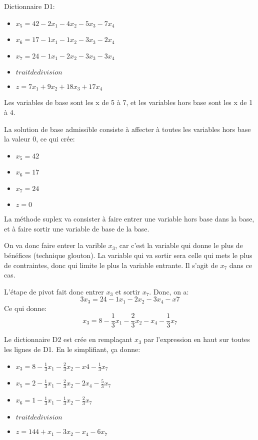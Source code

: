 Dictionnaire D1:
\begin{itemize}
    \item $x_5 = 42 - 2x_1 - 4x_2 - 5x_3 - 7x_4$
    \item $x_6 = 17 - 1x_1 - 1x_2 - 3x_3 - 2x_4$
    \item $x_7 = 24 - 1x_1 - 2x_2 - 3x_3 - 3x_4$
    \item $trait de division$
    \item $z = 7x_1 + 9x_2 + 18x_3 + 17 x_4$
\end{itemize}

Les variables de base sont les x de 5 à 7, et les
variables hors base sont les x de 1 à 4.

La solution de base admissible consiste à affecter à
toutes les variables hors base la valeur 0, ce qui crée:
\begin{itemize}
    \item $x_5 = 42$
    \item $x_6 = 17$
    \item $x_7 = 24$
    \item $z = 0$
\end{itemize}

La méthode suplex va consister à faire entrer une
variable hors base dans la base, et à faire sortir une
variable de base de la base.

On va donc faire entrer la varible $x_3$, car c'est la
variable qui donne le plus de bénéfices
(technique glouton). La variable qui va sortir sera
celle qui mets le plus de contraintes, donc qui limite
le plus la variable entrante. Il s'agit de $x_7$ dans
ce cas.

L'étape de pivot fait donc entrer $x_3$ et sortir $x_7$.
Donc, on a:
$$3x_3 = 24 - 1x_1 - 2x_2 - 3x_4 - x7$$
Ce qui donne:
$$x_3 = 8 - \frac{1}{3}x_1 - \frac{2}{3}x_2 - x_4 - \frac{1}{3}x_7$$

Le dictionnaire D2 est crée en remplaçant $x_3$ par l'expression en haut sur toutes les lignes de D1. En le
simplifiant, ça donne:
\begin{itemize}
    \item $x_3 = 8 - \frac{1}{3}x_1 - \frac{2}{3}x_2 - x4 - \frac{1}{3}x_7$
    \item $x_5 = 2 - \frac{1}{3}x_1 - \frac{2}{3}x_2 - 2x_4 - \frac{5}{3}x_7$
    \item $x_6 = 1 - \frac{1}{3}x_1 - \frac{1}{3}x_2 - \frac{2}{3}x_7$
    \item $trait de division$
    \item $z = 144 + x_1 - 3x_2 - x_4 - 6x_7$
\end{itemize}

